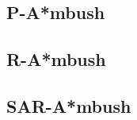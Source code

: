 \begin{comment}
Adicionalmente, el número de agentes suele no ser
lo suficientemente grande para afectar significativamente
la complejidad del algoritmo. Casos extremos en los que
sea necesaria la utilización de un gran número de agentes,
se pueden solucionar con la agrupación de éstos bajo líderes
ficticios \cite{MF09}, de modo que por cada grupo se realice un solo
cálculo del camino. Naturalmente, mientras se agrupen los
individuos en conjuntos más grandes, la diversidad de
caminos se verá afectada negativamente.
\end{comment}

\subsection{P-A*mbush}

\subsection{R-A*mbush}

\subsection{SAR-A*mbush}
